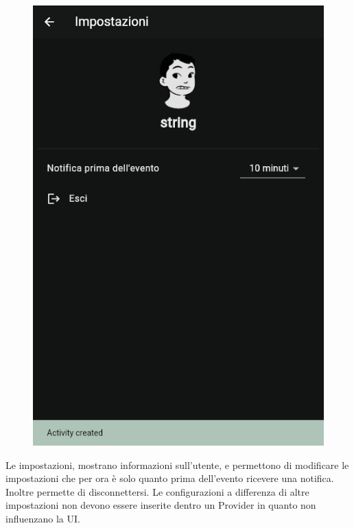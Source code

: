 \documentclass[a4paper,12pt]{article}
\begin{document}
\begin{figure}
    \vspace{-26pt}
    \center
    \includegraphics[width=0.5\linewidth]{img/settings.png}
\end{figure}
Le impostazioni, mostrano informazioni sull'utente, e permettono di modificare le impostazioni che per ora è solo quanto prima dell'evento ricevere una notifica. Inoltre permette di disconnettersi.
Le configurazioni a differenza di altre impostazioni non devono essere inserite dentro un Provider in quanto non influenzano la UI.
\end{document}
